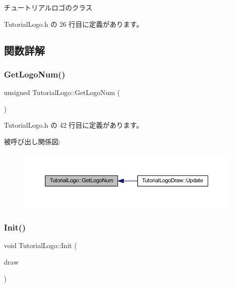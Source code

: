 チュートリアルロゴのクラス 

 Tutorial\+Logo.\+h の 26 行目に定義があります。



\subsection{関数詳解}
\mbox{\label{class_tutorial_logo_af4735bb34e06803ff13ae227fcf74e09}} 
\subsubsection{\texorpdfstring{Get\+Logo\+Num()}{GetLogoNum()}}
{\footnotesize\ttfamily unsigned Tutorial\+Logo\+::\+Get\+Logo\+Num (\begin{DoxyParamCaption}{ }\end{DoxyParamCaption})\hspace{0.3cm}{\ttfamily [inline]}}



 Tutorial\+Logo.\+h の 42 行目に定義があります。

被呼び出し関係図\+:\nopagebreak
\begin{figure}[H]
\begin{center}
\leavevmode
\includegraphics[width=350pt]{class_tutorial_logo_af4735bb34e06803ff13ae227fcf74e09_icgraph}
\end{center}
\end{figure}
\mbox{\label{class_tutorial_logo_a590f017a6b0532d08c1377b90b8fba3f}} 
\subsubsection{\texorpdfstring{Init()}{Init()}}
{\footnotesize\ttfamily void Tutorial\+Logo\+::\+Init (\begin{DoxyParamCaption}\item[{\mbox{\hyperlink{class_draw_base}{Draw\+Base}} $\ast$}]{draw }\end{DoxyParamCaption})}




